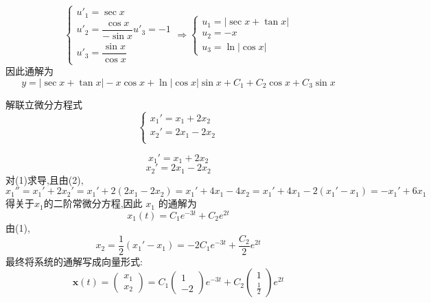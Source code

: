 \begin{questions}
\begin{solution}
\[\begin{cases}
        u'_1 = \sec x \\[2pt]
        u'_2 = \dfrac{\cos x}{-\sin x} u'_3 = -1 \\[6pt]
        u'_3 = \dfrac{\sin x}{\cos x}
        \end{cases}
        \Rightarrow
        \begin{cases}
        u_1 = |\sec x + \tan x| \\[1pt]
        u_2 = -x \\[1pt]
        u_3 = \ln |\cos x|
        \end{cases}
        \]
        因此通解为
        \[
        y = |\sec x + \tan x| - x\cos x + \ln |\cos x| \sin x + C_1 + C_2 \cos x + C_3 \sin x
        \]
    \end{solution}

    \question 解联立微分方程式
    \[
    \begin{cases}
    x_1' = x_1 + 2x_2 \\ 
    x_2' = 2x_1 - 2x_2 \\
    \end{cases}
    \]
    \begin{solution}
        \[
        x_1' = x_1 + 2x_2 \tag{1}
        \]
        \[
        x_2' = 2x_1 - 2x_2 \tag{2}
        \]
        对(1)求导,且由(2),
        \[
        x_1'' = x_1' + 2 x_2' = x_1' + 2(2x_1 - 2x_2) = x_1' + 4x_1 - 4x_2 = x_1' + 4x_1 - 2(x_1' - x_1) = -x_1' + 6x_1
        \]
        得关于$x_1$的二阶常微分方程,因此 $x_1$ 的通解为
        \[
        x_1(t) = C_1 e^{-3t} + C_2 e^{2t}
        \]
        由(1),
        \[
        x_2 = \frac{1}{2}(x_1' - x_1) = -2 C_1 e^{-3t} + \frac{C_2}{2} e^{2t}
        \]
        最终将系统的通解写成向量形式:
        \[
        \boldsymbol{x}(t) = 
        \begin{pmatrix} x_1 \\ x_2 \end{pmatrix}
        = C_1 \begin{pmatrix} 1 \\ -2 \end{pmatrix} e^{-3t} + C_2 \begin{pmatrix} 1 \\ \frac{1}{2} \end{pmatrix} e^{2t}
        \]
    \end{solution}


\end{questions}
